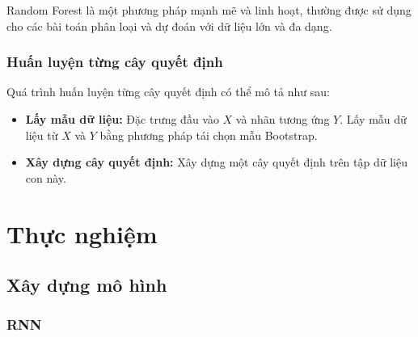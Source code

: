 \documentclass[conference]{IEEEtran}
\begin{document}
Random Forest là một phương pháp mạnh mẽ và linh hoạt, thường được sử dụng cho các bài toán phân loại và dự đoán với dữ liệu lớn và đa dạng.

\subsubsection{Huấn luyện từng cây quyết định}

Quá trình huấn luyện từng cây quyết định có thể mô tả như sau:

\begin{itemize}
  \item \textbf{Lấy mẫu dữ liệu:} Đặc trưng đầu vào $X$ và nhãn tương ứng $Y$. Lấy mẫu dữ liệu từ $X$ và $Y$ bằng phương pháp tái chọn mẫu Bootstrap.
  
  \item \textbf{Xây dựng cây quyết định:} Xây dựng một cây quyết định trên tập dữ liệu con này.
\end{itemize}

\section{Thực nghiệm}
\subsection{Xây dựng mô hình}

\subsubsection{RNN}
\end{document}
